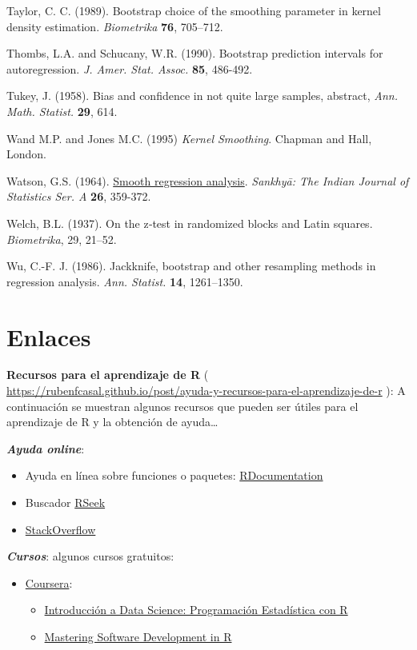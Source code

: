 \documentclass[
]{book}
\theoremstyle{break}
\theoremstyle{definition}
\theoremstyle{definition}
\theoremstyle{definition}
\theoremstyle{remark}
\begin{document}
Taylor, C. C. (1989). Bootstrap choice of the smoothing parameter in
kernel density estimation. \emph{Biometrika} \textbf{76}, 705--712.

Thombs, L.A. and Schucany, W.R. (1990). Bootstrap prediction intervals
for autoregression. \emph{J. Amer. Stat. Assoc.} \textbf{85}, 486-492.

Tukey, J. (1958). Bias and confidence in not quite large samples,
abstract, \emph{Ann. Math. Statist.} \textbf{29}, 614.

Wand M.P. and Jones M.C. (1995) \emph{Kernel Smoothing}. Chapman and Hall, London.

Watson, G.S. (1964). \href{https://www.jstor.org/stable/25049340?seq=1\#page_scan_tab_contents}{Smooth regression analysis}. \emph{Sankhy{ā}: The Indian Journal of Statistics Ser. A}
\textbf{26}, 359-372.

Welch, B.L. (1937). On the z‐test in randomized blocks and Latin squares. \emph{Biometrika}, 29, 21--52.

Wu, C.-F. J. (1986). Jackknife, bootstrap and other resampling methods
in regression analysis. \emph{Ann. Statist.} \textbf{14}, 1261--1350.

\hypertarget{appendix-apendices}{%
\appendix}


\hypertarget{links}{%
\chapter{Enlaces}\label{links}}

\textbf{Recursos para el aprendizaje de R} ( \url{https://rubenfcasal.github.io/post/ayuda-y-recursos-para-el-aprendizaje-de-r}
): A continuación se muestran algunos recursos que pueden ser útiles para el aprendizaje de R y la obtención de ayuda\ldots{}

\textbf{\emph{Ayuda online}}:

\begin{itemize}
\item
  Ayuda en línea sobre funciones o paquetes: \href{https://www.rdocumentation.org/}{RDocumentation}
\item
  Buscador \href{http://rseek.org/}{RSeek}
\item
  \href{http://stackoverflow.com/questions/tagged/r}{StackOverflow}
\end{itemize}

\textbf{\emph{Cursos}}:
algunos cursos gratuitos:

\begin{itemize}
\item
  \href{https://www.coursera.org/}{Coursera}:

  \begin{itemize}
  \item
    \href{https://www.coursera.org/learn/intro-data-science-programacion-estadistica-r}{Introducción a Data Science: Programación Estadística con R}
  \item
    \href{https://www.coursera.org/specializations/r}{Mastering Software Development in R}
  \end{itemize}
\end{itemize}
\end{document}
